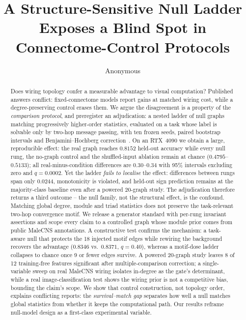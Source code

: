 \documentclass[10pt,twocolumn,letterpaper]{article}
\title{A Structure-Sensitive Null Ladder Exposes a Blind Spot in\\ Connectome-Control Protocols}
\author{Anonymous}
\begin{document}
\maketitle

\begin{abstract}
Does wiring topology confer a measurable advantage to visual computation?
Published answers conflict: fixed-connectome models report gains at matched
wiring cost, while a degree-preserving control erases them. We argue the
disagreement is a property of the \emph{comparison protocol}, and preregister
an adjudication: a nested ladder of null graphs matching progressively
higher-order statistics, evaluated on a task whose label is solvable only by
two-hop message passing, with ten frozen seeds, paired bootstrap intervals and
Benjamini--Hochberg correction~\cite{benjamini1995}. On an RTX~4090 we obtain a large, reproducible
effect: the real graph reaches $0.8152$ held-out accuracy while every null rung,
the no-graph control and the shuffled-input ablation remain at chance
($0.4795$--$0.5133$); all real-minus-condition differences are
$0.30$--$0.34$ with 95\% intervals excluding zero and $q=0.0002$. Yet the
ladder \emph{fails to localise} the effect: differences between rungs span only
$0.0244$, monotonicity is violated, and held-out sign prediction remains at
the majority-class baseline even after a powered 20-graph study. The
adjudication therefore returns a third outcome -- the null family, not the
structural effect, is the confound. Matching global degree, module and triad
statistics does not preserve the task-relevant two-hop convergence motif. We
release a generator standard with per-rung invariant assertions and scope every
claim to a controlled graph whose module prior comes from public MaleCNS
annotations. A constructive test confirms the mechanism: a task-aware null
that protects the 18 injected motif edges while rewiring the background
recovers the advantage ($0.8346$ vs.\ $0.8371$, $q=0.40$), whereas a
motif-dose ladder collapses to chance once 9 or fewer edges survive. A powered
20-graph study leaves 8 of 12 training-free features significant after
multiple-comparison correction; a single-variable sweep on real MaleCNS
wiring isolates in-degree as the gate's determinant, while a real
image-classification test shows the wiring prior is not a competitive bias,
bounding the claim's scope. We show that control construction, not topology order, explains
conflicting reports: the \emph{survival--match gap} separates how well a null
matches global statistics from whether it keeps the computational path.
Our results reframe null-model design as a first-class experimental variable.
\end{abstract}
\end{document}
